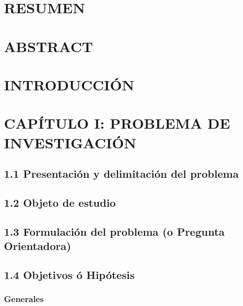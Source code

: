 \documentclass[12pt]{../componentes/uns}
\begin{document}
\newpage
\tableofcontents
\newpage

\listoffigures
\newpage

\listoftables
\newpage

\section*{RESUMEN}
\lipsum[3] %

\section*{ABSTRACT}
\lipsum[4] %

\newpage
\section{INTRODUCCIÓN}
\lipsum[5]

\newpage
\section{CAPÍTULO I: PROBLEMA DE INVESTIGACIÓN}
\subsection{1.1 Presentación y delimitación del problema}
\lipsum[6]

\subsection{1.2 Objeto de estudio}
\lipsum[7]

\subsection{1.3 Formulación del problema (o Pregunta Orientadora)}
\lipsum[8]

\subsection{1.4 Objetivos ó Hipótesis}
\subsubsection{Generales}
\lipsum[9]
\end{document}

